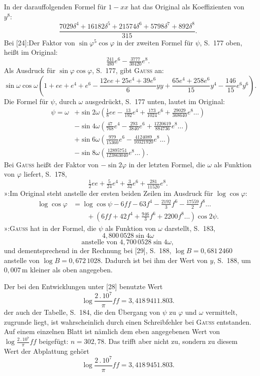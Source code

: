 {\small
\noindent In der darauffolgenden Formel für \(1-xx\) hat das Original als Koeffizienten von \(y^8\):
\[
\frac{7029\delta^4+16182\delta^5+21574\delta^6+5798\delta^7+892\delta^8}{315}.
\]
\noindent Bei [24]:\quad Der Faktor von \(\sin\varphi^5\cos\varphi\) in der zweiten Formel
für \(\psi\), S.\ 177 oben, heißt im Original:
\[
\tfrac{241}{480}e^6-\tfrac{3777}{30420}e^8.
\]
\noindent Als Ausdruck für \(\sin\varphi\cos\varphi\), S.\ 177, gibt \textsc{Gauss} an:
\[
\sin\omega\cos\omega\left(1+ee+e^4+e^6-\frac{12ee+25e^4+39e^6}{6}yy
+\frac{65e^4+258e^6}{15}y^4-\frac{146}{15}e^6y^6\right).
\]
\noindent Die Formel für \(\psi\), durch \(\omega\) ausgedrückt, S.\ 177 unten, lautet im Original:
\[
\begin{aligned}
\psi=\omega&+\sin2\omega\left(\frac18ee-\frac{13}{192}e^4+\frac{173}{1024}e^6
+\frac{29029}{368640}e^8\ldots\right)\\
&-\sin4\omega\left(\frac{47}{768}e^4-\frac{293}{3840}e^6+\frac{1220619}{884736}e^8\ldots\right)\\
&+\sin6\omega\left(\frac{979}{15360}e^6-\frac{4124089}{10321920}e^8\ldots\right)\\
&-\sin8\omega\left(\frac{12895751}{123863040}e^8\ldots\right).
\end{aligned}
\]
\noindent Bei \textsc{Gauss} heißt der Faktor von \(-\sin2\varphi\) in der letzten Formel,
die \(\omega\) als Funktion von \(\varphi\) liefert, S.\ 178,
\[
\tfrac12ee+\tfrac5{24}e^4+\tfrac3{32}e^6+\tfrac{281}{11520}e^8.
\]
\noindent »\quad [26]:\quad Im Original steht anstelle der ersten beiden Zeilen im Ausdruck
für \(\log\cos\varphi\):
\[
\begin{aligned}
\log\cos\varphi&=\log\cos\psi-6ff-63f^4-\frac{2192}3f^6-\frac{17559}2f^8\ldots\\
&\qquad+\left(6ff+42f^4+\frac{946}3f^6+2200f^8\ldots\right)\cos2\psi.
\end{aligned}
\]
\noindent »\quad [28]:\quad \textsc{Gauss} hat in der Formel, die \(\psi\) als Funktion
von \(\omega\) darstellt, S.\ 183,
\[
4{,}800\,0528\sin4\omega
\]
\[
\text{anstelle von }4{,}700\,0528\sin4\omega,
\]
\noindent und dementsprechend in der Rechnung bei [29], S.\ 188,
\(\log B=0{,}681\,2460\) anstelle von \(\log B=0{,}672\,1028\). Dadurch ist bei ihm
der Wert von \(y\), S.\ 188, um \(0{,}007\,\mathrm m\) kleiner als oben angegeben.

\noindent Der bei den Entwicklungen unter [28] benutzte Wert
\[
\log\frac{2\,.\,10^7}{\pi}ff=3{,}418\,9411.803.
\]
\noindent der auch der Tabelle, S.\ 184, die den Übergang von \(\psi\) zu \(\varphi\)
und \(\omega\) vermittelt, zugrunde liegt, ist wahrscheinlich durch einen Schreibfehler
bei \textsc{Gauss} entstanden. Auf einem einzelnen Blatt ist nämlich dem eben
angegebenen Wert von \(\log\frac{2\,.\,10^7}{\pi}ff\) beigefügt: \(n=302{,}78\).
Das trifft aber nicht zu, sondern zu diesem Wert der Abplattung gehört
\[
\log\frac{2\,.\,10^7}{\pi}ff=3{,}418\,9451.803.
\]
\par}

